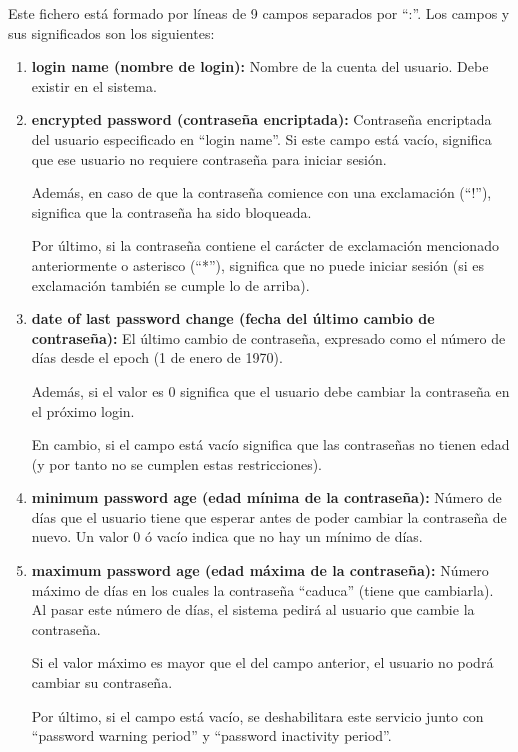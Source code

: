 \documentclass{article}
\begin{document}
Este fichero está formado por líneas de 9 campos separados por ``:''. Los campos y sus significados son los siguientes:

\begin{enumerate}
    \item \textbf{login name (nombre de login): }Nombre de la cuenta del usuario. Debe existir en el sistema.
    
    \item \textbf{encrypted password (contraseña encriptada): }Contraseña encriptada del usuario especificado en ``login name''. Si este campo está vacío, significa que ese usuario no requiere contraseña para iniciar sesión. 
    
    Además, en caso de que la contraseña comience con una exclamación (``!''), significa que la contraseña ha sido bloqueada.

    Por último, si la contraseña contiene el carácter de exclamación mencionado anteriormente o asterisco (``*''), significa que no puede iniciar sesión (si es exclamación también se cumple lo de arriba).

    \item \textbf{date of last password change (fecha del último cambio de contraseña): }El último cambio de contraseña, expresado como el número de días desde el epoch (1 de enero de 1970).
    
    Además, si el valor es 0 significa que el usuario debe cambiar la contraseña en el próximo login.

    En cambio, si el campo está vacío significa que las contraseñas no tienen edad (y por tanto no se cumplen estas restricciones).

    \item \textbf{minimum password age (edad mínima de la contraseña): }Número de días que el usuario tiene que esperar antes de poder cambiar la contraseña de nuevo. Un valor 0 ó vacío indica que no hay un mínimo de días.
    \item \textbf{maximum password age (edad máxima de la contraseña): }Número máximo de días en los cuales la contraseña ``caduca'' (tiene que cambiarla). Al pasar este número de días, el sistema pedirá al usuario que cambie la contraseña.
    
    Si el valor máximo es mayor que el del campo anterior, el usuario no podrá cambiar su contraseña.

    Por último, si el campo está vacío, se deshabilitara este servicio junto con ``password warning period'' y ``password inactivity period''.


\end{enumerate}
\end{document}
